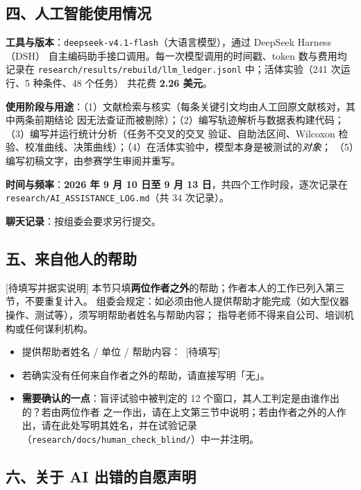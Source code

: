 \documentclass[10pt]{article}
\begin{document}
\subsection*{四、人工智能使用情况}

\textbf{工具与版本}：\texttt{deepseek-v4.1-flash}（大语言模型），通过 DeepSeek Harness（DSH）
自主编码助手接口调用。每一次模型调用的时间戳、token 数与费用均记录在
\texttt{research/results/rebuild/llm\_ledger.jsonl} 中；活体实验（241 次运行、5 种条件、48 个任务）
共花费 \textbf{2.26 美元}。

\textbf{使用阶段与用途}：（1）文献检索与核实（每条关键引文均由人工回原文献核对，其中两条前期结论
因无法查证而被剔除）；（2）编写轨迹解析与数据表构建代码；（3）编写并运行统计分析（任务不交叉的交叉
验证、自助法区间、Wilcoxon 检验、校准曲线、决策曲线）；（4）在活体实验中，模型本身是被测试的\emph{对象}；
（5）编写初稿文字，由参赛学生审阅并重写。

\textbf{时间与频率}：\textbf{2026 年 9 月 10 日至 9 月 13 日}，共四个工作时段，逐次记录在
\texttt{research/AI\_ASSISTANCE\_LOG.md}（共 34 次记录）。

\textbf{聊天记录}：按组委会要求另行提交。

\subsection*{五、来自他人的帮助}

[待填写并据实说明] 本节只填\textbf{两位作者之外}的帮助；作者本人的工作已列入第三节，不要重复计入。
组委会规定：如必须由他人提供帮助才能完成（如大型仪器操作、测试等），须写明帮助者姓名与帮助内容；
指导老师不得来自公司、培训机构或任何谋利机构。

\begin{itemize}[leftmargin=1.3em,itemsep=2pt]
  \item 提供帮助者姓名 / 单位 / 帮助内容：\ [待填写]
  \item 若确实没有任何来自作者之外的帮助，请直接写明「无」。
  \item \textbf{需要确认的一点}：盲评试验中被判定的 12 个窗口，其人工判定是由谁作出的？若由两位作者
        之一作出，请在上文第三节中说明；若由作者之外的人作出，请在此处写明其姓名，并在试验记录
        （\texttt{research/docs/human\_check\_blind/}）中一并注明。
\end{itemize}

\subsection*{六、关于 AI 出错的自愿声明}
\end{document}
